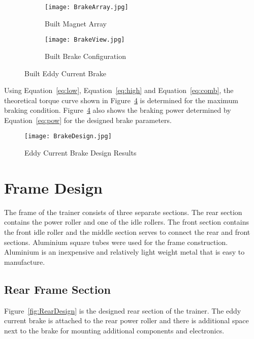 \begin{figure}[H]
	\centering
	\begin{subfigure}{.4\textwidth}
		\centering
		\texttt{[image: BrakeArray.jpg]}
		\caption{Built Magnet Array}
		\label{fig:magarr}
	\end{subfigure}%
	\hfill
	\begin{subfigure}{.4\textwidth}
		\centering
		\texttt{[image: BrakeView.jpg]}
		\caption{Built Brake Configuration}
		\label{fig:brakefin}
	\end{subfigure}
	\caption{Built Eddy Current Brake}
	\label{fig:magets}
\end{figure}

\vspace*{-0.5cm}

Using Equation~\ref{eq:low}, Equation~\ref{eq:high} and Equation~\ref{eq:comb}, the theoretical torque curve shown in Figure~\ref{fig:BrakeDesign} is determined for the maximum braking condition. Figure~\ref{fig:BrakeDesign} also shows the braking power determined by Equation~\ref{eq:pow} for the designed brake parameters.

\begin{figure}[H]
	\centering
	\texttt{[image: BrakeDesign.jpg]}
	\caption{Eddy Current Brake Design Results}
	\label{fig:BrakeDesign}
\end{figure}

\vspace*{-0.9cm}

\section{Frame Design}

The frame of the trainer consists of three separate sections. The rear section contains the power roller and one of the idle rollers. The front section contains the front idle roller and the middle section serves to connect the rear and front sections. Aluminium square tubes were used for the frame construction. Aluminium is an inexpensive and relatively light weight metal that is easy to manufacture.

\vspace*{-0.5cm}

\subsection{Rear Frame Section}

Figure~\ref{fig:RearDesign} is the designed rear section of the trainer. The eddy current brake is attached to the rear power roller and there is additional space next to the brake for mounting additional components and electronics. 


